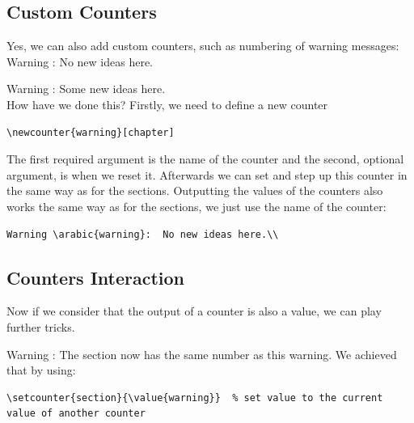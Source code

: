 \documentclass[a4paper,10pt]{report} %
\begin{document}
\subsection{Custom Counters}
Yes, we can also add custom counters, such as numbering of warning messages:\\

 Warning :  No new ideas here.\\
 \addtocounter{warning}{4}
 Warning :  Some new ideas here.\\
 
 How have we done this? Firstly, we need to define a new counter
\begin{lstlisting}[language={[latex]tex}, 
  frame=single,
  basicstyle=\footnotesize\color{darkgray}, 
  keywordstyle=\bf\color{magenta},
  commentstyle=\color{ForestGreen},  %
  breaklines=true
  ]
  \newcounter{warning}[chapter] 
\end{lstlisting}
The first required argument is the name of the counter and the second, optional argument, is when we reset it.
Afterwards we can set and step up this counter in the same way as for the sections. Outputting the values  of the counters also works the same way as for the sections, we just use the name of the counter:
\begin{lstlisting}[language={[latex]tex}, frame=single,basicstyle=\footnotesize,
  keywordstyle=\bf,
  commentstyle=\it\color{gray}
  ]
  Warning \arabic{warning}:  No new ideas here.\\
\end{lstlisting}

\setcounter{section}{\value{warning}}

\subsection{Counters Interaction}
Now if we consider that the output of a counter is also a value, we can play further tricks. 

Warning :  The section now has the same number as this warning. We achieved that by using:\\

\begin{lstlisting}[language={[latex]tex}, frame=single,basicstyle=\footnotesize\color{darkgray}, 
  keywordstyle=\bf\color{magenta},
  commentstyle=\color{ForestGreen},  
  breaklines=true
  ]
\setcounter{section}{\value{warning}}  % set value to the current  value of another counter 
\end{lstlisting}
\end{document}
